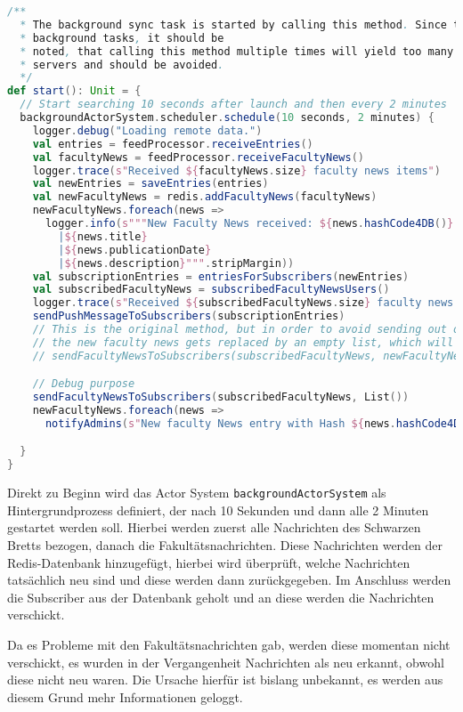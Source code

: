 \begin{lstlisting}[language=scala, style=scala, caption={Start Methode der Klasse BackgroundFeedSync}]
/**
  * The background sync task is started by calling this method. Since this starts the
  * background tasks, it should be
  * noted, that calling this method multiple times will yield too many calls to the feed's
  * servers and should be avoided.
  */
def start(): Unit = {
  // Start searching 10 seconds after launch and then every 2 minutes
  backgroundActorSystem.scheduler.schedule(10 seconds, 2 minutes) {
    logger.debug("Loading remote data.")
    val entries = feedProcessor.receiveEntries()
    val facultyNews = feedProcessor.receiveFacultyNews()
    logger.trace(s"Received ${facultyNews.size} faculty news items")
    val newEntries = saveEntries(entries)
    val newFacultyNews = redis.addFacultyNews(facultyNews)
    newFacultyNews.foreach(news =>
      logger.info(s"""New Faculty News received: ${news.hashCode4DB()}
        |${news.title}
        |${news.publicationDate}
        |${news.description}""".stripMargin))
    val subscriptionEntries = entriesForSubscribers(newEntries)
    val subscribedFacultyNews = subscribedFacultyNewsUsers()
    logger.trace(s"Received ${subscribedFacultyNews.size} faculty news subscribers")
    sendPushMessageToSubscribers(subscriptionEntries)
    // This is the original method, but in order to avoid sending out outdated faculty news,
    // the new faculty news gets replaced by an empty list, which will result in no messages sent.
    // sendFacultyNewsToSubscribers(subscribedFacultyNews, newFacultyNews)

    // Debug purpose
    sendFacultyNewsToSubscribers(subscribedFacultyNews, List())
    newFacultyNews.foreach(news =>
      notifyAdmins(s"New faculty News entry with Hash ${news.hashCode4DB()}"))

  }
}
\end{lstlisting}

Direkt zu Beginn wird das Actor System \texttt{backgroundActorSystem} als Hintergrundprozess definiert, der nach 10 Sekunden und dann alle 2 Minuten gestartet werden soll. Hierbei werden zuerst alle Nachrichten des Schwarzen Bretts bezogen, danach die Fakultätsnachrichten. Diese Nachrichten werden der Redis-Datenbank hinzugefügt, hierbei wird überprüft, welche Nachrichten tatsächlich neu sind und diese werden dann zurückgegeben. Im Anschluss werden die Subscriber aus der Datenbank geholt und an diese werden die Nachrichten verschickt.

Da es Probleme mit den Fakultätsnachrichten gab, werden diese momentan nicht verschickt, es wurden in der Vergangenheit Nachrichten als neu erkannt, obwohl diese nicht neu waren. Die Ursache hierfür ist bislang unbekannt, es werden aus diesem Grund mehr Informationen geloggt.

